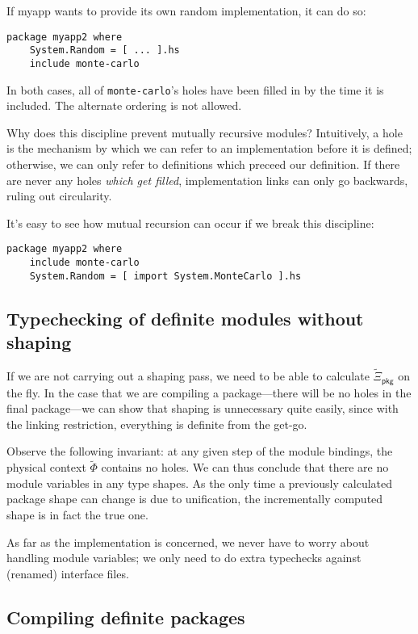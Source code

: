 \documentclass{article}
\begin{document}
If myapp wants to provide its own random implementation, it can do so:

\begin{verbatim}
package myapp2 where
    System.Random = [ ... ].hs
    include monte-carlo
\end{verbatim}

In both cases, all of \verb|monte-carlo|'s holes have been filled in by the time
it is included.  The alternate ordering is not allowed.

Why does this discipline prevent mutually recursive modules?  Intuitively,
a hole is the mechanism by which we can refer to an implementation
before it is defined; otherwise, we can only refer to definitions which
preceed our definition. If there are never any holes \emph{which get filled},
implementation links can only go backwards, ruling out circularity.

It's easy to see how mutual recursion can occur if we break this discipline:

\begin{verbatim}
package myapp2 where
    include monte-carlo
    System.Random = [ import System.MonteCarlo ].hs
\end{verbatim}

\subsection{Typechecking of definite modules without shaping}

If we are not carrying out a shaping pass, we need to be able to calculate
$\widetilde{\Xi}_{\mathsf{pkg}}$ on the fly.  In the case that we are
compiling a package---there will be no holes in the final package---we
can show that shaping is unnecessary quite easily, since with the
linking restriction, everything is definite from the get-go.

Observe the following invariant: at any given step of the module
bindings, the physical context $\widetilde{\Phi}$ contains no
holes.  We can thus conclude that there are no module variables in any
type shapes.  As the only time a previously calculated package shape can
change is due to unification, the incrementally computed shape is in
fact the true one.

As far as the implementation is concerned, we never have to worry
about handling module variables; we only need to do extra typechecks
against (renamed) interface files.

\subsection{Compiling definite packages}\label{sec:compiling}
\end{document}

